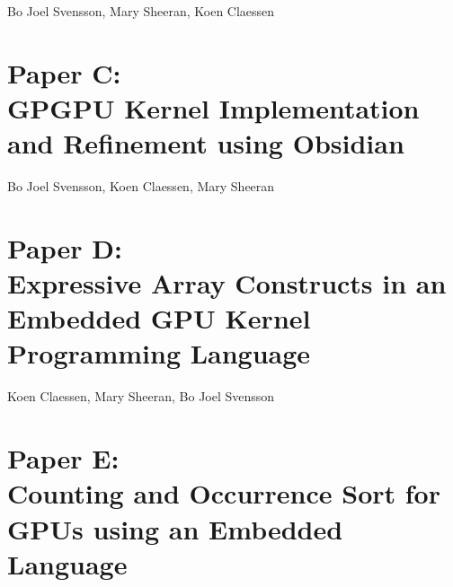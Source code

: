 \documentclass[a4paper]{book}
\newcommand{\paperBTitle}{Obsidian: A Domain Specific Embedded Language for Parallel Programming of Graphics Processors}
\newcommand{\paperC}{Paper C}
\newcommand{\paperCTitle}{GPGPU Kernel Implementation and Refinement using Obsidian}
\newcommand{\paperD}{Paper D}
\newcommand{\paperDTitle}{Expressive Array Constructs in an Embedded GPU Kernel Programming Language}
\newcommand{\paperE}{Paper E}
\newcommand{\paperETitle}{Counting and Occurrence Sort for GPUs using an Embedded Language}
\begin{document}

\begin{center} 
Bo Joel Svensson, Mary Sheeran, Koen Claessen
\end{center}



% 
\cleardoublepage 

\section[\paperCTitle]{\paperC: \\ \paperCTitle}
\label{sec:paperC}


\begin{center} 
Bo Joel Svensson, Koen Claessen, Mary Sheeran
\end{center}




% 
\cleardoublepage 

\section[\paperDTitle]{\paperD: \\ \paperDTitle}
\label{sec:paperD}


\begin{center} 
Koen Claessen, Mary Sheeran, Bo Joel Svensson
\end{center}



% 
\cleardoublepage 

\section[\paperETitle]{\paperE: \\ \paperETitle}
\label{sec:paperE}
\end{document}
